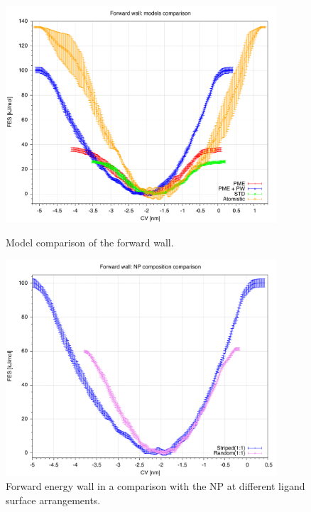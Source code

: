 \begin{figure}[pth]
	\centering
	\includegraphics[width=0.9\textwidth]{./img/results/FESModelComparison/forwardWall}
	\caption{Model comparison of the forward wall.}
	\label{fig:forwardWall}
	
	\vspace*{\floatsep}
	
	\includegraphics[width=0.9\textwidth]{./img/results/FESModelComparison/forwardWallRP}
	\caption{Forward energy wall in a comparison with the \ac{NP} at different ligand surface arrangements.}
	\label{fig:forwardWallRP}
\end{figure}

